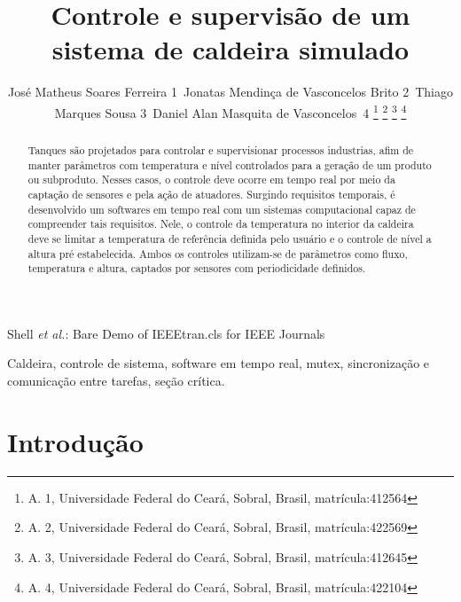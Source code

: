 \documentclass[journal]{IEEEtran}
\begin{document}
	
\title{Controle e supervisão de um sistema de caldeira simulado}

\author{José Matheus Soares Ferreira 1~Jonatas Mendinça de Vasconcelos Brito 2~Thiago Marques Sousa 3~Daniel Alan Masquita de Vasconcelos~4%
\thanks{A. 1, Universidade Federal do Ceará, Sobral, Brasil, matrícula:412564}%
\thanks{A. 2, Universidade Federal do Ceará, Sobral, Brasil, matrícula:422569}%
\thanks{A. 3, Universidade Federal do Ceará, Sobral, Brasil, matrícula:412645}%
\thanks{A. 4, Universidade Federal do Ceará, Sobral, Brasil, matrícula:422104}
}

%
{Shell \MakeLowercase{\textit{et al.}}: Bare Demo of IEEEtran.cls for IEEE Journals}


\maketitle

\begin{abstract}
Tanques são projetados para controlar e supervisionar processos industrias, afim de manter parâmetros com temperatura e nível controlados para a geração de um produto ou subproduto. Nesses casos, o controle deve ocorre em tempo real por meio da captação de sensores e pela ação de atuadores. Surgindo requisitos temporais, é desenvolvido um softwares em tempo real com um sistemas computacional capaz de compreender tais requisitos. Nele, o controle da temperatura no interior da caldeira deve se limitar a temperatura de referência definida pelo usuário e o controle de nível a altura pré estabelecida. Ambos os controles utilizam-se de parâmetros como fluxo, temperatura e altura, captados por sensores com periodicidade definidos.   
\end{abstract}

\begin{IEEEkeywords}
Caldeira, controle de sistema, software em tempo real, mutex, sincronização e comunicação entre tarefas, seção crítica.
\end{IEEEkeywords}

\IEEEpeerreviewmaketitle

\section{Introdução}
\end{document}
